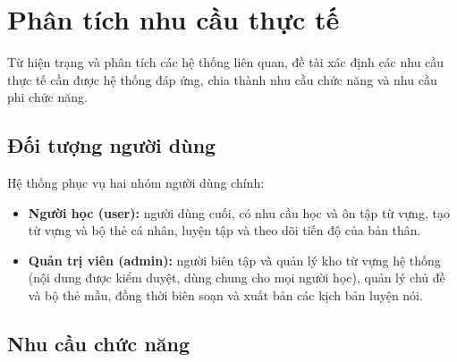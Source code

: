 \section{Phân tích nhu cầu thực tế}
\label{sec:phan-tich-nhu-cau}

Từ hiện trạng và phân tích các hệ thống liên quan, đề tài xác định các nhu
cầu thực tế cần được hệ thống đáp ứng, chia thành nhu cầu chức năng và nhu
cầu phi chức năng.

\subsection{Đối tượng người dùng}

Hệ thống phục vụ hai nhóm người dùng chính:

\begin{itemize}
  \item \textbf{Người học (user):} người dùng cuối, có nhu cầu học và ôn
        tập từ vựng, tạo từ vựng và bộ thẻ cá nhân, luyện tập và theo dõi
        tiến độ của bản thân.
  \item \textbf{Quản trị viên (admin):} người biên tập và quản lý kho từ
        vựng hệ thống (nội dung được kiểm duyệt, dùng chung cho mọi người
        học), quản lý chủ đề và bộ thẻ mẫu, đồng thời biên soạn và xuất bản
        các kịch bản luyện nói.
\end{itemize}

\subsection{Nhu cầu chức năng}

